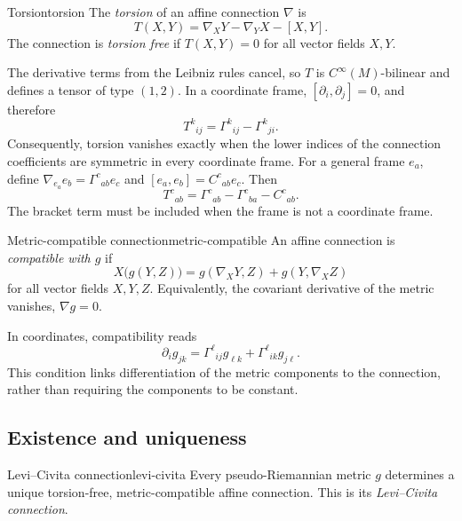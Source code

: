 \documentclass[11pt,a4paper]{article}
\numberwithin{equation}{section}
\newcommand{\Cinf}{C^\infty}
\begin{document}
\begin{definition}{Torsion}{torsion}
The \emph{torsion} of an affine connection \(\nabla\) is
\[
 T(X,Y)=\nabla_XY-\nabla_YX-[X,Y].
\]
The connection is \emph{torsion free} if \(T(X,Y)=0\) for all vector
fields \(X,Y\).
\end{definition}

The derivative terms from the Leibniz rules cancel, so \(T\) is
\(\Cinf(M)\)-bilinear and defines a tensor of type \((1,2)\). In a
coordinate frame, \([\partial_i,\partial_j]=0\), and therefore
\[
 T^k{}_{ij}=\Gamma^k{}_{ij}-\Gamma^k{}_{ji}.
\]
Consequently, torsion vanishes exactly when the lower indices of the
connection coefficients are symmetric in every coordinate frame. For a general frame \(e_a\), define
\(\nabla_{e_a}e_b=\Gamma^c{}_{ab}e_c\) and
\([e_a,e_b]=C^c{}_{ab}e_c\). Then
\[
 T^c{}_{ab}=\Gamma^c{}_{ab}-\Gamma^c{}_{ba}-C^c{}_{ab}.
\]
The bracket term must be included when the frame is not a coordinate frame.

\begin{definition}{Metric-compatible connection}{metric-compatible}
An affine connection is \emph{compatible with \(g\)} if
\[
 X\bigl(g(Y,Z)\bigr)
 =g(\nabla_XY,Z)+g(Y,\nabla_XZ)
\]
for all vector fields \(X,Y,Z\). Equivalently, the covariant derivative
of the metric vanishes, \(\nabla g=0\).
\end{definition}

In coordinates, compatibility reads
\begin{equation}
 \label{eq:metric-compatible-components}
 \partial_i g_{jk}
 =\Gamma^\ell{}_{ij}g_{\ell k}
  +\Gamma^\ell{}_{ik}g_{j\ell}.
\end{equation}
This condition links differentiation of the metric components to the
connection, rather than requiring the components to be constant.

\subsection{Existence and uniqueness}

\begin{theorem}{Levi--Civita connection}{levi-civita}
Every pseudo-Riemannian metric \(g\) determines a unique torsion-free,
metric-compatible affine connection. This is its \emph{Levi--Civita
connection}.
\end{theorem}
\end{document}
